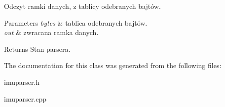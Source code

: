Odczyt ramki danych, z tablicy odebranych bajtów. 


\begin{DoxyParams}{Parameters}
{\em bytes} & tablica odebranych bajtów. \\
\hline
{\em out} & zwracana ramka danych. \\
\hline
\end{DoxyParams}
\begin{DoxyReturn}{Returns}
Stan parsera. 
\end{DoxyReturn}


The documentation for this class was generated from the following files\+:\begin{DoxyCompactItemize}
\item 
imuparser.\+h\item 
imuparser.\+cpp\end{DoxyCompactItemize}
